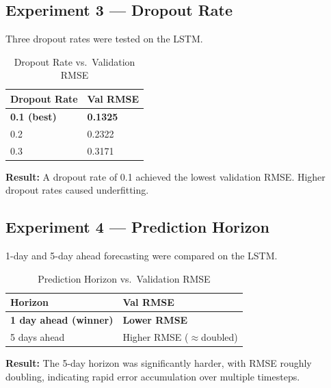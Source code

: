 \documentclass[12pt, a4paper]{article}
\begin{document}
\subsection{Experiment 3 --- Dropout Rate}

Three dropout rates were tested on the LSTM.

\vspace{4pt}
\begin{table}[H]
\caption{Dropout Rate vs.\ Validation RMSE}
\label{tab:dropout}
\begin{tabularx}{\textwidth}{C{5cm} C{5cm}}
\color{white}\textbf{Dropout Rate} & \color{white}\textbf{Val RMSE} \\
\midrule
\textbf{0.1 (best)} & \textbf{0.1325} \\
0.2                 & 0.2322 \\
0.3                 & 0.3171 \\
\bottomrule
\end{tabularx}
\end{table}

\textbf{Result:} A dropout rate of 0.1 achieved the lowest validation RMSE. Higher dropout rates caused underfitting.

\subsection{Experiment 4 --- Prediction Horizon}

1-day and 5-day ahead forecasting were compared on the LSTM.

\vspace{4pt}
\begin{table}[H]
\caption{Prediction Horizon vs.\ Validation RMSE}
\label{tab:horizon}
\begin{tabularx}{\textwidth}{C{5cm} C{5cm}}
\color{white}\textbf{Horizon} & \color{white}\textbf{Val RMSE} \\
\midrule
\textbf{1 day ahead (winner)} & \textbf{Lower RMSE} \\
5 days ahead & Higher RMSE ($\approx$doubled) \\
\bottomrule
\end{tabularx}
\end{table}

\textbf{Result:} The 5-day horizon was significantly harder, with RMSE roughly doubling, indicating rapid error accumulation over multiple timesteps.
\end{document}

